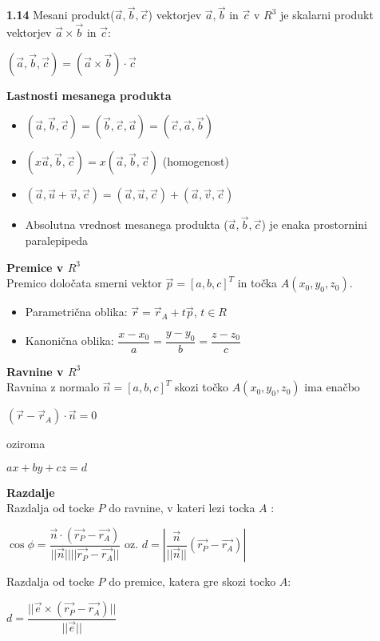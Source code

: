 \documentclass{article}
\begin{document}
\begin{multicols}{2}
\textbf{1.14} Mesani produkt($\vec{a}, \vec{b}, \vec{c}$) vektorjev
$\vec{a}, \vec{b}$ in $\vec{c}$ v $R^{3}$ je skalarni produkt vektorjev
$\vec{a} \times \vec{b}$ in $\vec{c}$:
\begin{center}
    $(\vec{a}, \vec{b}, \vec{c}) = (\vec{a} \times \vec{b})\cdot \vec{c}$
\end{center}

\textbf{Lastnosti mesanega produkta}
\begin{itemize}
    \item $(\vec{a}, \vec{b}, \vec{c}) = (\vec{b}, \vec{c}, \vec{a}) = (\vec{c}, \vec{a}, \vec{b})$
    \item $(x\vec{a}, \vec{b}, \vec{c}) = x(\vec{a}, \vec{b}, \vec{c})$ (homogenost)
    \item $(\vec{a}, \vec{u} + \vec{v}, \vec{c}) = (\vec{a}, \vec{u}, \vec{c}) + (\vec{a}, \vec{v}, \vec{c})$
    \item Absolutna vrednost mesanega produkta ($\vec{a}, \vec{b}, \vec{c}$) je enaka prostornini paralepipeda
\end{itemize}
    
\textbf{Premice v $R^{3}$} \\
Premico določata smerni vektor $\vec{p} = [a, b, c]^{T}$ in točka $A(x_0, y_0, z_0)$.
\begin{itemize}
    \item Parametrična oblika:
        $\vec{r} = \vec{r}_{A} + t\vec{p}$, $t \in R$
    \item Kanonična oblika:
        $\dfrac{x - x_{0}}{a} = \dfrac{y - y_{0}}{b} = \dfrac{z - z_{0}}{c}$
\end{itemize}

\textbf{Ravnine v $R^{3}$} \\
Ravnina z normalo $\vec{n} = [a, b, c]^T$ skozi točko $A(x_0, y_0, z_0)$ ima enačbo
\begin{center}
    $(\vec{r} - \vec{r}_A) \cdot \vec{n} = 0$
\end{center}
oziroma
\begin{center}
    $ax + by + cz = d$
\end{center}

\textbf{Razdalje}\\
Razdalja od tocke $P$ do ravnine, v kateri lezi tocka $A$ :
\begin{center}
    $\cos\phi = \dfrac{\vec{n} \cdot ( \vec{r_{P}} - \vec{r_{A}})} {||\vec{n}|| ||\vec{r_{P}} - \vec{r_{A}}||}$ oz.
    $d = |\dfrac{\vec{n}}{||\vec{n}||} ( \vec{r_{P}} - \vec{r_{A}})|$
\end{center}
Razdalja od tocke $P$ do premice, katera gre skozi tocko $A$:
\begin{center}
    $d = \dfrac{||\vec{e} \times ( \vec{r_{P}} - \vec{r_{A}})||}{||\vec{e}||}$
\end{center}


\end{multicols}
\end{document}
